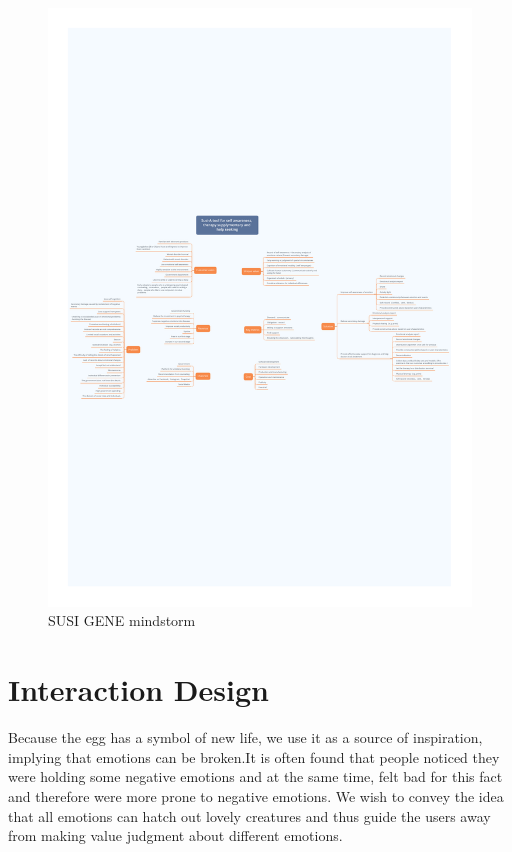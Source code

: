 \documentclass[manuscript,screen]{acmart}
\begin{document}
\begin{figure}[h]
  \centering
  \includegraphics[width=\linewidth]{Xmind.pdf}
  \caption{SUSI GENE mindstorm}
  \label{Xmind}
\end{figure}

\section{Interaction Design}

Because the egg has a symbol of new life, we use it as a source of inspiration, implying that emotions can be broken.It is often found that people noticed they were holding some negative emotions and at the same time, felt bad for this fact and therefore were more prone to negative emotions. We wish to convey the idea that all emotions can hatch out lovely creatures and thus guide the users away from making value judgment about different emotions.
\end{document}
